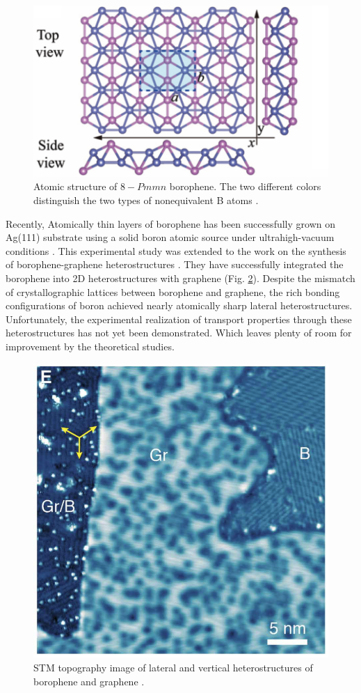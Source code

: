     \begin{figure}[H]
        \centering
        \includegraphics[width = 0.6\linewidth]{fig/Chap 2/borophene atomic structure.png}
        \caption{Atomic structure of $8-Pmmn$ borophene. The two different colors distinguish the two types of nonequivalent B atoms \cite{Cheng2017a}.}
        \label{2fig:borophene atomic structure}
    \end{figure}
    
    Recently, Atomically thin layers of borophene has been successfully grown on Ag(111) substrate using a solid boron atomic source under ultrahigh-vacuum conditions \cite{Mannix2015a}.
    This experimental study was extended to the work on the synthesis of borophene-graphene heterostructures \cite{Liu2019}.
    They have successfully integrated the borophene into 2D heterostructures with graphene (Fig. \ref{2fig:borophene graphene hetero}).
    Despite the mismatch of crystallographic lattices between borophene and graphene, the rich bonding configurations of boron achieved nearly atomically sharp lateral heterostructures.
    Unfortunately, the experimental realization of transport properties through these heterostructures has not yet been demonstrated.
    Which leaves plenty of room for improvement by the theoretical studies.
    
    \begin{figure}[H]
        \centering
        \includegraphics[width = 0.4\linewidth]{fig/Chap 2/borophene graphene.png}
        \caption{STM topography image of lateral and vertical heterostructures of borophene and graphene \cite{Liu2019}.}
        \label{2fig:borophene graphene hetero}
    \end{figure}
    



